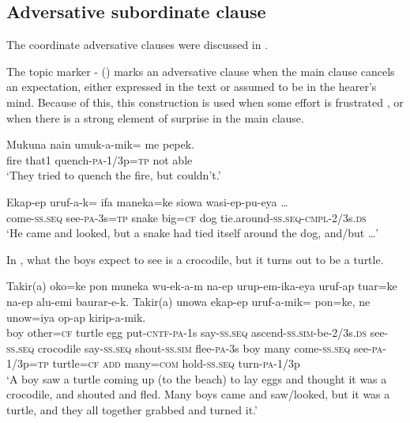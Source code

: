 \subsection{Adversative subordinate clause} \label{sec:8.3.4}

The coordinate adversative clauses were discussed in .

The topic marker - () marks an adversative clause when the main clause cancels an expectation, either expressed in the text or assumed to be in the hearer's mind. Because of this, this construction is used when some effort is frustrated , or when there is a strong element of surprise  in the main clause. 

\ea%
\label{ex:8:x729}
\gll Mukuna  nain  umuk-a-mik=  me  pepek.\\
fire  that1 quench-\textsc{pa}-1/3p=\textsc{tp} not able\\
\glt`They tried to quench the fire, but couldn't.'
\z


\ea%
\label{ex:8:x730}
\gll Ekap-ep  uruf-a-k=  ifa  maneka=ke  siowa wasi-ep-pu-eya {\dots} \\
come-\textsc{ss}.\textsc{seq} see-\textsc{pa}-3s=\textsc{tp} snake  big=\textsc{cf} dog tie.around-\textsc{ss}.\textsc{seq}-\textsc{cmpl}-2/3s.\textsc{ds}\\
\glt`He came and looked, but a snake had tied itself around the dog, and/but {\dots}'
\z


In , what the boys expect to see is a crocodile, but it turns out to be a turtle.

\ea%
\label{ex:8:x1393}
\gll Takir(a)  oko=ke  pon  muneka  wu-ek-a-m  na-ep urup-em-ika-eya  uruf-ap  tuar=ke  na-ep alu-emi  baurar-e-k.  Takir(a)  unowa  ekap-ep uruf-a-mik=  pon=ke,  ne  unow=iya  op-ap kirip-a-mik.\\
boy  other=\textsc{cf} turtle egg  put-\textsc{cntf}-\textsc{pa}-1s  say-\textsc{ss}.\textsc{seq} ascend-\textsc{ss}.\textsc{sim}-be-2/3s.\textsc{ds} see-\textsc{ss}.\textsc{seq} crocodile say-\textsc{ss}.\textsc{seq} shout-\textsc{ss}.\textsc{sim} flee-\textsc{pa}-3s boy  many come-\textsc{ss}.\textsc{seq} see-\textsc{pa}-1/3p=\textsc{tp} turtle=\textsc{cf} \textsc{add} many=\textsc{com} hold-\textsc{ss}.\textsc{seq} turn-\textsc{pa}-1/3p\\
\glt`A boy saw a turtle coming up (to the beach) to lay eggs and thought it was a crocodile, and shouted and fled. Many boys came and saw/looked, but it was a turtle, and they all together grabbed and turned it.'
\z
{}


